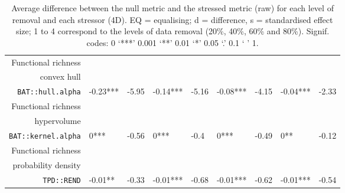 \begin{table}[ht]
\begin{tabular}{rllllllll}
  Functional richness\\convex hull\\\texttt{BAT::hull.alpha} & -0.23*** & -5.95 & -0.14*** & -5.16 & -0.08*** & -4.15 & -0.04*** & -2.33 \\ 
  Functional richness\\hypervolume\\\texttt{BAT::kernel.alpha} & 0*** & -0.56 & 0*** & -0.4 & 0*** & -0.49 & 0** & -0.12 \\ 
  Functional richness\\probability density\\\texttt{TPD::REND} & -0.01** & -0.33 & -0.01*** & -0.68 & -0.01*** & -0.62 & -0.01*** & -0.54 \\ 
   \hline
\end{tabular}
\caption{Average difference between the null metric and the stressed metric (raw) for each level of removal and each stressor (4D). EQ = equalising; d = difference, s = standardised effect size; 1 to 4 correspond to the levels of data removal (20\%, 40\%, 60\% and 80\%). Signif. codes:  0 ‘***’ 0.001 ‘**’ 0.01 ‘*’ 0.05 ‘.’ 0.1 ‘ ’ 1.} 
\end{table}

